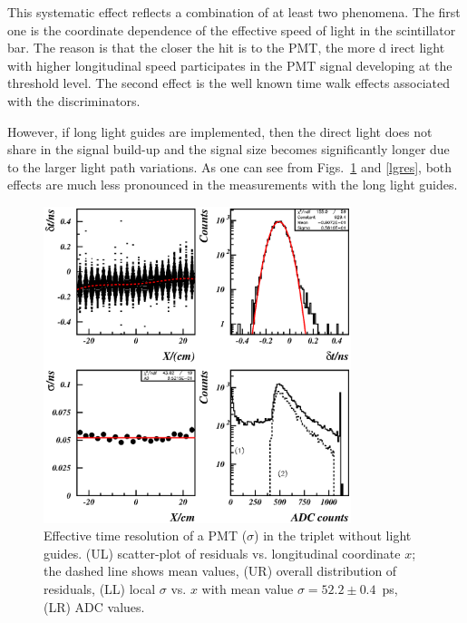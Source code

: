 This systematic effect reflects a combination of at least two phenomena. 
The first one is the coordinate dependence of the effective speed of light in the  
scintillator bar.  The reason is that the closer the hit is to the PMT, the more d
irect light with higher longitudinal speed participates in the PMT signal developing 
at the threshold level.  The second effect is the well known time walk effects
associated with the discriminators.

However, if long light guides are implemented, then the direct light does not 
share in the signal build-up and the signal size becomes significantly longer 
due to the larger light path variations.  As one can see from Figs.~\ref{nlgres}
and \ref{lgres}, both effects are much less pronounced in the measurements with   
the long light guides.
 
\begin{figure}[htbp]
\centering
\includegraphics[width=0.8\textwidth]{cosmic-6pmtnlg_picture.ps}
\caption{\small{Effective time resolution of a PMT ($\sigma$) in the triplet 
without light guides.  (UL) scatter-plot of residuals vs. longitudinal 
coordinate $x$; the dashed line shows mean values, (UR) overall distribution of 
residuals, (LL) local $\sigma$ vs. $x$ with mean value $\sigma=52.2\pm0.4$~ps, 
(LR) ADC values.}} 
\label{nlgres}
\end{figure}

